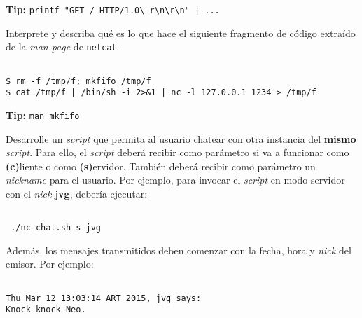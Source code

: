 \begin{questions}
\begin{lstlisting}
  \end{lstlisting}

  \textbf{Tip:} \texttt{printf "GET / HTTP/1.0\textbackslash
    r\textbackslash n\textbackslash r\textbackslash n" | ... }

  \question Interprete y describa qué es lo que hace el siguiente fragmento
  de código extraído de la \textit{man page} de \texttt{netcat}.
  \begin{lstlisting}

$ rm -f /tmp/f; mkfifo /tmp/f
$ cat /tmp/f | /bin/sh -i 2>&1 | nc -l 127.0.0.1 1234 > /tmp/f
  \end{lstlisting}

  \textbf{Tip:} \texttt{man mkfifo}

  \question Desarrolle un \textit{script} que permita al usuario chatear
  con otra instancia del \textbf{mismo} \textit{script}. Para ello, el
  \textit{script} deberá recibir como parámetro si va a funcionar como
  \textbf{(c)}liente o como \textbf{(s)}ervidor. También deberá recibir
  como parámetro un \textit{nickname} para el usuario. Por ejemplo, para
  invocar el \textit{script} en modo servidor con el \textit{nick}
  \textbf{jvg}, debería ejecutar:

  \begin{lstlisting}

 ./nc-chat.sh s jvg
  \end{lstlisting}

Además, los mensajes transmitidos deben comenzar con la fecha, hora y
\textit{nick} del emisor. Por ejemplo:
\begin{lstlisting}
  
Thu Mar 12 13:03:14 ART 2015, jvg says:
Knock knock Neo.
\end{lstlisting}  

\end{questions}
